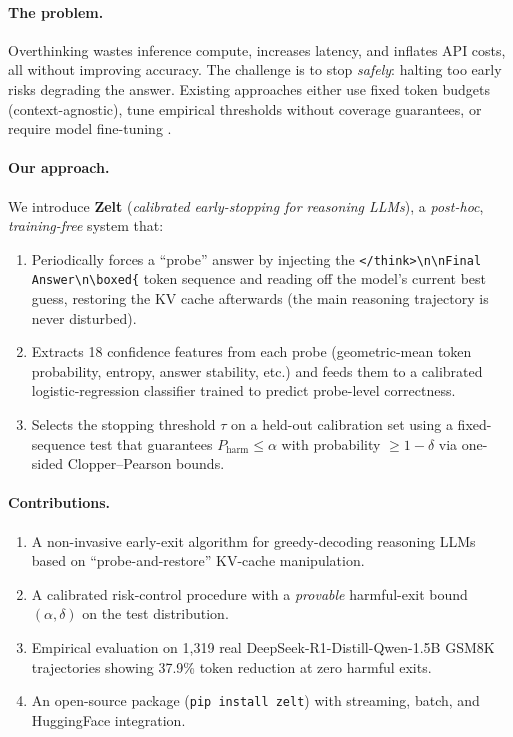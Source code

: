 \documentclass[11pt]{article}
\begin{document}
\paragraph{The problem.}
Overthinking wastes inference compute, increases latency, and
inflates API costs, all without improving accuracy.
The challenge is to stop \emph{safely}: halting too early
risks degrading the answer.
Existing approaches either use fixed token budgets
(context-agnostic), tune empirical thresholds without
coverage guarantees, or require model fine-tuning
\citep{han2024tokenbudget,wang2025conformal}.

\paragraph{Our approach.}
We introduce \textbf{Zelt} (\emph{calibrated early-stopping for
reasoning LLMs}), a \emph{post-hoc}, \emph{training-free}
system that:
\begin{enumerate}
  \item Periodically forces a ``probe'' answer by injecting the
        \texttt{</think>\textbackslash n\textbackslash nFinal Answer\textbackslash n\textbackslash boxed\{} token sequence
        and reading off the model's current best guess, restoring
        the KV cache afterwards (the main reasoning trajectory is
        never disturbed).
  \item Extracts 18 confidence features from each probe
        (geometric-mean token probability, entropy, answer stability,
        etc.) and feeds them to a calibrated logistic-regression
        classifier trained to predict probe-level correctness.
  \item Selects the stopping threshold $\tau$ on a held-out
        calibration set using a fixed-sequence test that
        guarantees $P_{\mathrm{harm}} \le \alpha$ with probability
        $\ge 1 - \delta$ via one-sided Clopper--Pearson bounds.
\end{enumerate}

\paragraph{Contributions.}
\begin{enumerate}
  \item A non-invasive early-exit algorithm for greedy-decoding
        reasoning LLMs based on ``probe-and-restore'' KV-cache
        manipulation.
  \item A calibrated risk-control procedure with a
        \emph{provable} harmful-exit bound $(\alpha, \delta)$
        on the test distribution.
  \item Empirical evaluation on 1{,}319 real DeepSeek-R1-Distill-Qwen-1.5B
        GSM8K trajectories showing 37.9\% token reduction at zero
        harmful exits.
  \item An open-source package (\texttt{pip install zelt}) with
        streaming, batch, and HuggingFace integration.
\end{enumerate}
\end{document}
